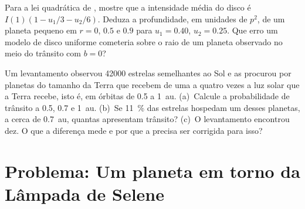 \begin{exercise}[$\star\star\star$]\label{exo:b3:exoplanets:11}
Para a lei quadrática de , mostre que a intensidade média do
disco é $I(1)(1 - u_1/3 - u_2/6)$. Deduza a profundidade, em unidades de
$p^2$, de um planeta pequeno em $r = 0$, $0.5$ e $0.9$ para $u_1 = 0.40$,
$u_2 = 0.25$. Que erro um modelo de disco uniforme cometeria sobre o raio de
um planeta observado no meio do trânsito com $b = 0$?
\end{exercise}

\begin{exercise}[$\star\star\star$]\label{exo:b3:exoplanets:12}
Um levantamento observou \num{42000} estrelas semelhantes ao Sol e as procurou por
planetas do tamanho da Terra que recebem de uma a quatro vezes a luz solar que a Terra recebe,
isto é, em órbitas de 0.5 a \qty{1}{au}. (a)~Calcule a
probabilidade de trânsito a 0.5, 0.7 e \qty{1}{au}. (b)~Se \qty{11}{\percent} das
estrelas hospedam um desses planetas, a cerca de \qty{0.7}{au}, quantas apresentam trânsito?
(c)~O levantamento encontrou dez. O que a diferença mede e por que
a  precisa ser corrigida para isso?
\end{exercise}

\section{Problema: Um planeta em torno da Lâmpada de Selene}

